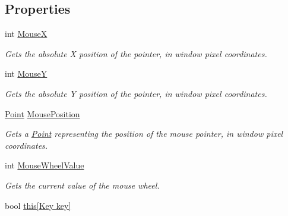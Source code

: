 \subsection*{Properties}
\begin{DoxyCompactItemize}
\item 
int \hyperlink{interface_tri_devs_1_1_tri_engine2_d_1_1_input_1_1_i_input_manager_a545e03fc7c5084bcf00f018145625c19}{Mouse\-X}
\begin{DoxyCompactList}\small\item\em Gets the absolute X position of the pointer, in window pixel coordinates. \end{DoxyCompactList}\item 
int \hyperlink{interface_tri_devs_1_1_tri_engine2_d_1_1_input_1_1_i_input_manager_a143f5147279fe1807635d1e8b9b4e7c7}{Mouse\-Y}
\begin{DoxyCompactList}\small\item\em Gets the absolute Y position of the pointer, in window pixel coordinates. \end{DoxyCompactList}\item 
\hyperlink{struct_tri_devs_1_1_tri_engine2_d_1_1_point}{Point} \hyperlink{interface_tri_devs_1_1_tri_engine2_d_1_1_input_1_1_i_input_manager_a59ffc200aff9e1b5c2830dbc7492152a}{Mouse\-Position}
\begin{DoxyCompactList}\small\item\em Gets a \hyperlink{struct_tri_devs_1_1_tri_engine2_d_1_1_point}{Point} representing the position of the mouse pointer, in window pixel coordinates. \end{DoxyCompactList}\item 
int \hyperlink{interface_tri_devs_1_1_tri_engine2_d_1_1_input_1_1_i_input_manager_a7d42befc637abbaf51f46ba93d12aff8}{Mouse\-Wheel\-Value}
\begin{DoxyCompactList}\small\item\em Gets the current value of the mouse wheel. \end{DoxyCompactList}\item 
bool \hyperlink{interface_tri_devs_1_1_tri_engine2_d_1_1_input_1_1_i_input_manager_a4864942443d3939d630504c7da9fbfd6}{this\mbox{[}\-Key key\mbox{]}}

\end{DoxyCompactItemize}
